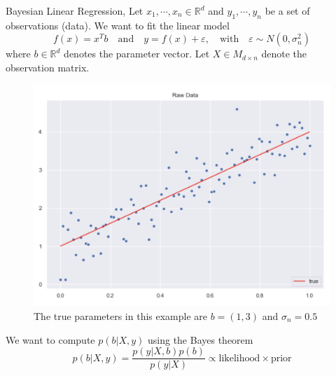 \documentclass[10pt]{beamer}
\begin{document}
\begin{frame}{Bayesian Linear Regression}{\cite{reg_bayesian_regression_2019}, \cite[Chapter 2.1]{RW05}}
Let $x_1, \cdots, x_n \in \mathbb{R}^d$ and $y_1, \cdots, y_n$ be a set of observations (data). We want to fit the linear model 
$$
f(x) = x^T b \quad \text{and} \quad y = f(x) + \varepsilon, \quad \text{with} \quad \varepsilon \sim N(0, \sigma_n^2)
$$
where $b \in \mathbb{R}^d$ denotes the parameter vector. Let $X \in M_{d \times n}$ denote the observation matrix. 
\begin{center}
\begin{figure}
\includegraphics[scale=0.14]{images/lin_raw_data.png} 
\caption{The true parameters in this example are $b=(1, 3)$ and $\sigma_n=0.5$}
\end{figure}
\end{center}
We want to compute $p(b|X, y)$ using the Bayes theorem 
$$
p(b|X, y) = \frac{p(y|X, b) p(b)}{p(y|X) } \propto \text{likelihood} \times \text{prior}
$$
\end{frame}
\end{document}
